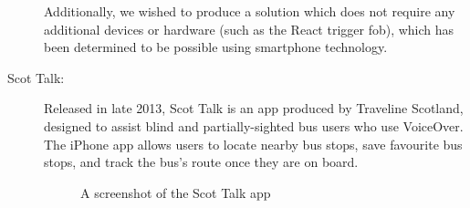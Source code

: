 \documentclass[10pt,twocolumn]{article}
\newcommand{\citep}[1]{}
\begin{document}
\begin{description}
Additionally, we wished to produce a solution which does not require any additional devices or hardware (such as the React trigger fob), which has been determined to be possible using smartphone technology.

\item[Scot Talk:]
Released in late 2013, Scot Talk is an app produced by Traveline Scotland, designed to assist blind and partially-sighted bus users who use VoiceOver. The iPhone app allows users to locate nearby bus stops, save favourite bus stops, and track the bus's route once they are on board\citep{scottalk}.

\begin{figure}[htbp]
  \centering
    \begin{minipage}[b]{0.45\linewidth}
    \centering
          \end{minipage}
    \caption{A screenshot of the Scot Talk app}
    \label{fig:scotTalk}
\end{figure}


\end{description}
\end{document}
